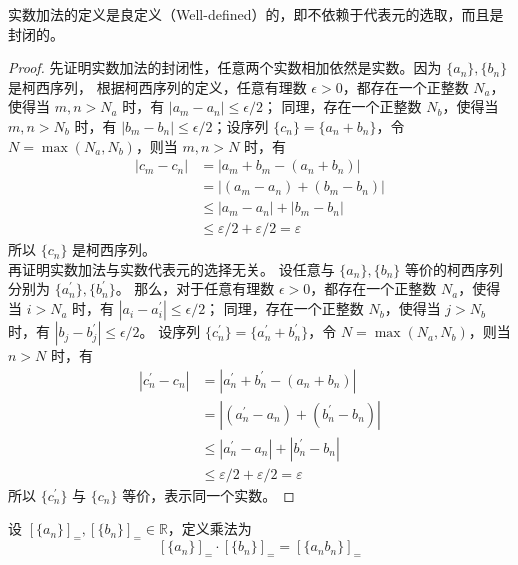 \begin{proposition}
    实数加法的定义是良定义（Well-defined）的，即不依赖于代表元的选取，而且是封闭的。
\end{proposition}
\begin{proof}
    先证明实数加法的封闭性，任意两个实数相加依然是实数。因为 $\{a_n\},\{b_n\}$ 是柯西序列，
    根据柯西序列的定义，任意有理数 $\epsilon>0$，都存在一个正整数 $N_a$，使得当 $m,n>N_a$ 时，有 $|a_m - a_n| \le \epsilon/2$；
    同理，存在一个正整数 $N_b$，使得当 $m,n>N_b$ 时，有 $|b_m - b_n| \le \epsilon/2$；设序列 $\{c_n\}=\{a_n+b_n\}$，令 $N=\max(N_a,N_b)$，则当 $m,n>N$ 时，有
    \begin{align*}
        |c_m-c_n| &= |a_m+b_m - (a_n+b_n)| \\
        &= |(a_m-a_n) + (b_m-b_n)| \\
        &\le |a_m-a_n| + |b_m-b_n| \\
        &\le \varepsilon/2 +  \varepsilon/2 = \varepsilon
    \end{align*}
    所以 $\{c_n\}$ 是柯西序列。\\
    再证明实数加法与实数代表元的选择无关。
    设任意与 $\{a_n\},\{b_n\}$ 等价的柯西序列分别为 $\{a_n^{\prime}\},\{b_n^{\prime}\}$。
    那么，对于任意有理数 $\epsilon>0$，都存在一个正整数 $N_a$，使得当 $i>N_a$ 时，有 $|a_i - a_i^{\prime}| \le \epsilon/2$；
    同理，存在一个正整数 $N_b$，使得当 $j>N_b$ 时，有 $|b_j - b_j^{\prime}| \le \epsilon/2$。
    设序列 $\{c_n^{\prime}\}=\{a_n^{\prime}+b_n^{\prime}\}$，令 $N=\max(N_a,N_b)$，则当 $n>N$ 时，有
    \begin{align*}
        |c^{\prime}_n-c_n| &= |a_n^{\prime}+b_n^{\prime} - (a_n+b_n)| \\
        &= |(a_n^{\prime}-a_n)+(b_n^{\prime}-b_n)|\\
        &\le |a_n^{\prime}-a_n|+|b_n^{\prime}-b_n|\\
        &\le \varepsilon/2 + \varepsilon/2 = \varepsilon
    \end{align*}
    所以 $\{c_n^{\prime}\}$ 与 $\{c_n\}$ 等价，表示同一个实数。
\end{proof}

\vspace{1em}

\begin{definition}
    设 $[\{a_n\}]_{=},[\{b_n\}]_{=}\in\mathbb{R}$，定义乘法为
    \[
        [\{a_n\}]_{=} \cdot [\{b_n\}]_{=} = [\{a_nb_n\}]_{=}
    \]
\end{definition}

